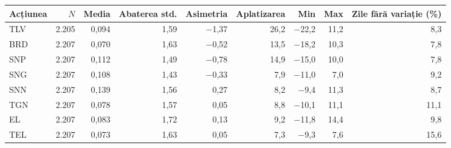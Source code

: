 \begin{tabular}{lrrrrrrrr}
\toprule
Acțiunea & $N$ & Media & Abaterea std. & Asimetria & Aplatizarea & Min & Max & Zile fără variație (\%) \\
\midrule
TLV & 2.205 & 0,094 & 1,59 & $-$1,37 & 26,2 & $-$22,2 & 11,2 & 8,3 \\
BRD & 2.207 & 0,070 & 1,63 & $-$0,52 & 13,5 & $-$18,2 & 10,3 & 7,8 \\
SNP & 2.207 & 0,112 & 1,49 & $-$0,78 & 14,9 & $-$15,0 & 10,0 & 7,8 \\
SNG & 2.207 & 0,108 & 1,43 & $-$0,33 & 7,9 & $-$11,0 & 7,0 & 9,2 \\
SNN & 2.207 & 0,139 & 1,56 & 0,27 & 8,2 & $-$9,4 & 11,3 & 8,7 \\
TGN & 2.207 & 0,078 & 1,57 & 0,05 & 8,8 & $-$10,1 & 11,1 & 11,1 \\
EL & 2.207 & 0,083 & 1,72 & 0,13 & 9,2 & $-$11,8 & 14,4 & 9,8 \\
TEL & 2.207 & 0,073 & 1,63 & 0,05 & 7,3 & $-$9,3 & 7,6 & 15,6 \\
\bottomrule
\end{tabular}
